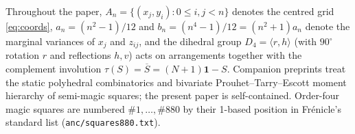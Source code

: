 Throughout the paper, $A_n=\{(x_j,y_i):0\le i,j<n\}$ denotes the centred grid \eqref{eq:coords}, $a_n=(n^2-1)/12$ and $b_n=(n^4-1)/12=(n^2+1)a_n$ denote the marginal variances of $x_j$ and $z_{ij}$, and the dihedral group $D_4=\langle r,h\rangle$ (with $90^\circ$ rotation $r$ and reflections $h,v$) acts on arrangements together with the complement involution $\tau(S)=\overline S=(N+1)\mathbf 1-S$. Companion preprints \citep{mathewson2026moments,mathewson2026gems} treat the static polyhedral combinatorics and bivariate Prouhet--Tarry--Escott moment hierarchy of semi-magic squares; the present paper is self-contained. Order-four magic squares are numbered $\#1,\dots,\#880$ by their 1-based position in Fr\'enicle's standard list (\texttt{anc/squares880.txt}).
